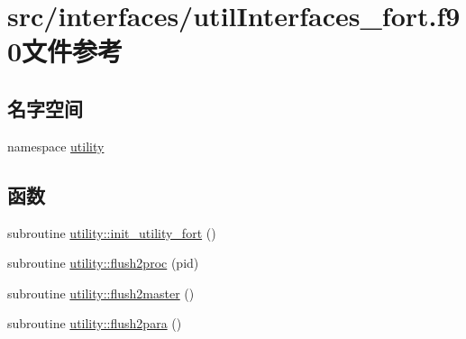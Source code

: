 \hypertarget{src_2interfaces_2utilInterfaces__fort_8f90}{
\section{src/interfaces/utilInterfaces\_\-fort.f90文件参考}
\label{src_2interfaces_2utilInterfaces__fort_8f90}
}
\subsection*{名字空间}
\begin{DoxyCompactItemize}
\item 
namespace \hyperlink{namespaceutility}{utility}
\end{DoxyCompactItemize}
\subsection*{函数}
\begin{DoxyCompactItemize}
\item 
subroutine \hyperlink{namespaceutility_aa465c4557a921fb97082d392421be1e7}{utility::init\_\-utility\_\-fort} ()
\item 
subroutine \hyperlink{namespaceutility_af89f3f402d624699dfad6c027d71d0cd}{utility::flush2proc} (pid)
\item 
subroutine \hyperlink{namespaceutility_a9253f21bd4ce5431fc25424cf9784dd2}{utility::flush2master} ()
\item 
subroutine \hyperlink{namespaceutility_a923d7c8623e057e6cfda701520ce279d}{utility::flush2para} ()
\end{DoxyCompactItemize}
